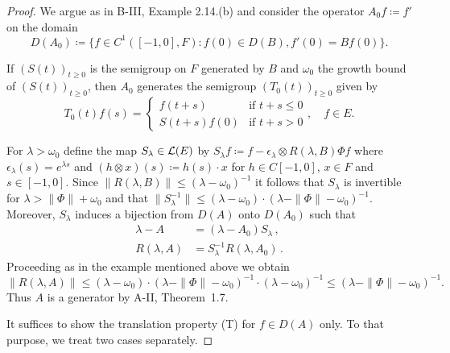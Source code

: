 \begin{proof} We argue as in B-III, Example 2.14.(b) and consider the operator $A_{0}f  \coloneq  f'$ on the domain 
\[D(A_{0})  \coloneq  \{f \in C^1([-1,0],F) \colon f(0) \in D(B), f'(0) = Bf(0)\}.\]

If $(S(t))_{t\geq 0}$ is the semigroup on $F$ generated by $B$ and $\omega_0$ the growth bound of $(S(t))_{t\geq 0}$, then $A_{0}$ generates the semigroup $(T_{0}(t))_{t\geq 0}$ given by
\[T_{0}(t)f(s) = \begin{cases}
	f(t+s) & \text{if } t+s \leq 0 \\
	S(t+s)f(0) & \text{if } t+s  >  0
\end{cases}, \quad f \in E.\]

For $\lambda  >  \omega_0$ define the map $S_{\lambda} \in \mathcal{L}(E)$ by $S_{\lambda}f  \coloneq  f - \epsilon_{\lambda}\otimes R(\lambda,B)\Phi f$ where $\epsilon_{\lambda}(s) = e^{\lambda s}$ and $(h\otimes x)(s)  \coloneq  h(s)\cdot x$ for $h \in C[-1,0]$, $x \in F$ and $s \in [-1,0]$.
Since $\|R(\lambda,B)\| \leq (\lambda-\omega_0)^{-1}$ it follows that $S_{\lambda}$ is invertible for $\lambda  >  \|\Phi\| + \omega_0$ and that $\|S_{\lambda}^{-1}\| \leq (\lambda-\omega_0)\cdot(\lambda-\|\Phi\|-\omega_0)^{-1}$.
Moreover, $S_{\lambda}$ induces a bijection from $D(A)$ onto $D(A_{0})$ such that
\begin{equation}\label{eq:b4-3.2}
	\begin{aligned}
		\lambda - A &= (\lambda - A_{0})S_{\lambda}\,, \\
		R(\lambda,A) &= S_{\lambda}^{-1}R(\lambda,A_{0})\,.
	\end{aligned}
\end{equation}
Proceeding as in the example mentioned above we obtain
\[\|R(\lambda,A)\| \leq (\lambda - \omega_0)\cdot(\lambda - \|\Phi\| - \omega_0)^{-1}\cdot(\lambda - \omega_0)^{-1} \leq (\lambda - \|\Phi\| - \omega_0)^{-1}.\]
Thus $A$ is a generator by A-II, Theorem~1.7.
%
%

It suffices to show the translation property (T) for $f \in D(A)$ only.
To that purpose, we treat two cases separately.


\end{proof}
